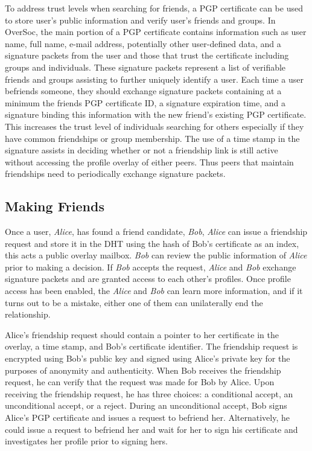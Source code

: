 \documentclass{sig-alternate}
\begin{document}
To address trust levels when searching for friends, a PGP certificate can be
used to store user's public information and verify user's friends and groups.
In OverSoc, the main portion of a PGP certificate contains information such as
user name, full name, e-mail address, potentially other user-defined data, and
a signature packets from the user and those that trust the certificate
including groups and individuals.  These signature packets represent a list of
verifiable friends and groups assisting to further uniquely identify a user.
Each time a user befriends someone, they should exchange signature packets
containing at a minimum the friends PGP certificate ID, a signature expiration
time, and a signature binding this information with the new friend's existing
PGP certificate.  This increases the trust level of individuals searching for
others especially if they have common friendships or group membership.  The use
of a time stamp in the signature assists in deciding whether or not a
friendship link is still active without accessing the profile overlay of either
peers.  Thus peers that maintain friendships need to periodically exchange
signature packets.

\subsection{Making Friends}

Once a user, \textit{Alice}, has found a friend candidate, \textit{Bob},
\textit{Alice} can issue a friendship request and store it in the DHT using the
hash of Bob's certificate as an index, this acts a public overlay mailbox.
\textit{Bob} can review the public information of \textit{Alice} prior to
making a decision.  If \textit{Bob} accepts the request, \textit{Alice} and
\textit{Bob} exchange signature packets and are granted access to each other's
profiles.  Once profile access has been enabled, the \textit{Alice} and
\textit{Bob} can learn more information, and if it turns out to be a mistake,
either one of them can unilaterally end the relationship.

Alice's friendship request should contain a pointer to her certificate in the
overlay, a time stamp, and Bob's certificate identifier.  The friendship
request is encrypted using Bob's public key and signed using Alice's private
key for the purposes of anonymity and authenticity.  When Bob receives the
friendship request, he can verify that the request was made for Bob by Alice.
Upon receiving the friendship request, he has three choices:  a conditional
accept, an unconditional accept, or a reject.  During an unconditional accept,
Bob signs Alice's PGP certificate and issues a request to befriend her.
Alternatively, he could issue a request to befriend her and wait for her to
sign his certificate and investigates her profile prior to signing hers.
\end{document}
